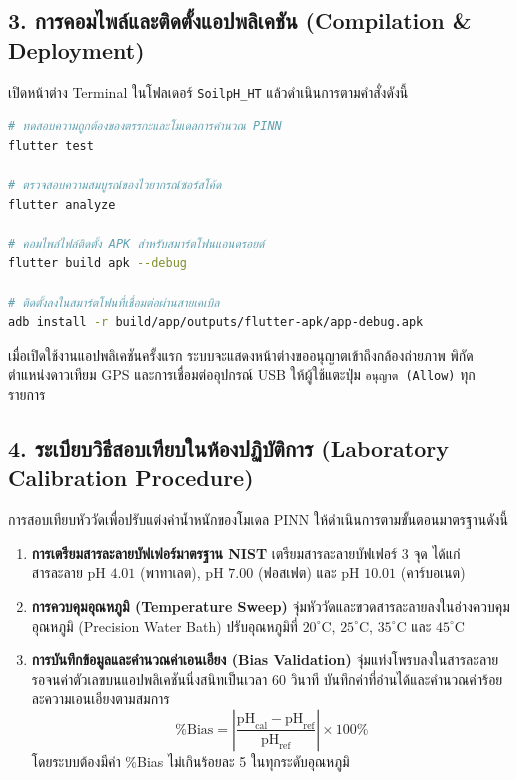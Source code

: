 \subsection{3. การคอมไพล์และติดตั้งแอปพลิเคชัน (Compilation \& Deployment)}
เปิดหน้าต่าง Terminal ในโฟลเดอร์ \texttt{SoilpH\_HT} แล้วดำเนินการตามคำสั่งดังนี้
\begin{lstlisting}[language=bash]
# ทดสอบความถูกต้องของตรรกะและโมเดลการคำนวณ PINN
flutter test

# ตรวจสอบความสมบูรณ์ของไวยากรณ์ซอร์สโค้ด
flutter analyze

# คอมไพล์ไฟล์ติดตั้ง APK สำหรับสมาร์ตโฟนแอนดรอยด์
flutter build apk --debug

# ติดตั้งลงในสมาร์ตโฟนที่เชื่อมต่อผ่านสายเคเบิล
adb install -r build/app/outputs/flutter-apk/app-debug.apk
\end{lstlisting}

เมื่อเปิดใช้งานแอปพลิเคชันครั้งแรก ระบบจะแสดงหน้าต่างขออนุญาตเข้าถึงกล้องถ่ายภาพ พิกัดตำแหน่งดาวเทียม GPS และการเชื่อมต่ออุปกรณ์ USB ให้ผู้ใช้แตะปุ่ม \texttt{อนุญาต (Allow)} ทุกรายการ

\subsection{4. ระเบียบวิธีสอบเทียบในห้องปฏิบัติการ (Laboratory Calibration Procedure)}
การสอบเทียบหัววัดเพื่อปรับแต่งค่าน้ำหนักของโมเดล PINN ให้ดำเนินการตามขั้นตอนมาตรฐานดังนี้
\begin{enumerate}
    \item \textbf{การเตรียมสารละลายบัฟเฟอร์มาตรฐาน NIST} เตรียมสารละลายบัฟเฟอร์ 3 จุด ได้แก่ สารละลาย $\text{pH } 4.01$ (พาทาเลต), $\text{pH } 7.00$ (ฟอสเฟต) และ $\text{pH } 10.01$ (คาร์บอเนต)
    \item \textbf{การควบคุมอุณหภูมิ (Temperature Sweep)} จุ่มหัววัดและขวดสารละลายลงในอ่างควบคุมอุณหภูมิ (Precision Water Bath) ปรับอุณหภูมิที่ $20^\circ\text{C}$, $25^\circ\text{C}$, $35^\circ\text{C}$ และ $45^\circ\text{C}$
    \item \textbf{การบันทึกข้อมูลและคำนวณค่าเอนเอียง (Bias Validation)} จุ่มแท่งโพรบลงในสารละลาย รอจนค่าตัวเลขบนแอปพลิเคชันนิ่งสนิทเป็นเวลา 60 วินาที บันทึกค่าที่อ่านได้และคำนวณค่าร้อยละความเอนเอียงตามสมการ
    \begin{equation}
    \text{\%Bias} = \left|\frac{\text{pH}_{\text{cal}} - \text{pH}_{\text{ref}}}{\text{pH}_{\text{ref}}}\right| \times 100\%
    \end{equation}
    โดยระบบต้องมีค่า \%Bias ไม่เกินร้อยละ 5 ในทุกระดับอุณหภูมิ
\end{enumerate}

